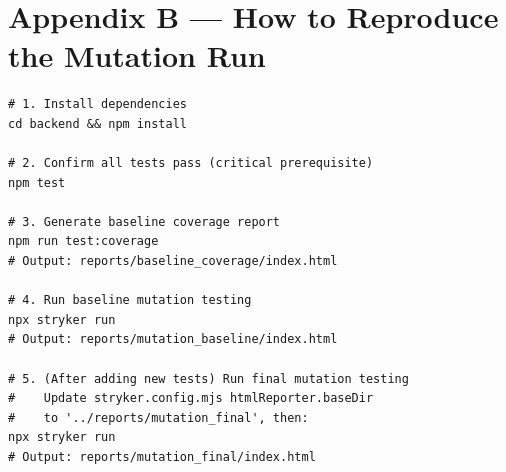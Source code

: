\documentclass[12pt, a4paper]{article}
\begin{document}
\section{Appendix B --- How to Reproduce the Mutation Run}

\begin{lstlisting}[caption={Full reproduction steps}]
# 1. Install dependencies
cd backend && npm install

# 2. Confirm all tests pass (critical prerequisite)
npm test

# 3. Generate baseline coverage report
npm run test:coverage
# Output: reports/baseline_coverage/index.html

# 4. Run baseline mutation testing
npx stryker run
# Output: reports/mutation_baseline/index.html

# 5. (After adding new tests) Run final mutation testing
#    Update stryker.config.mjs htmlReporter.baseDir
#    to '../reports/mutation_final', then:
npx stryker run
# Output: reports/mutation_final/index.html
\end{lstlisting}
\end{document}
